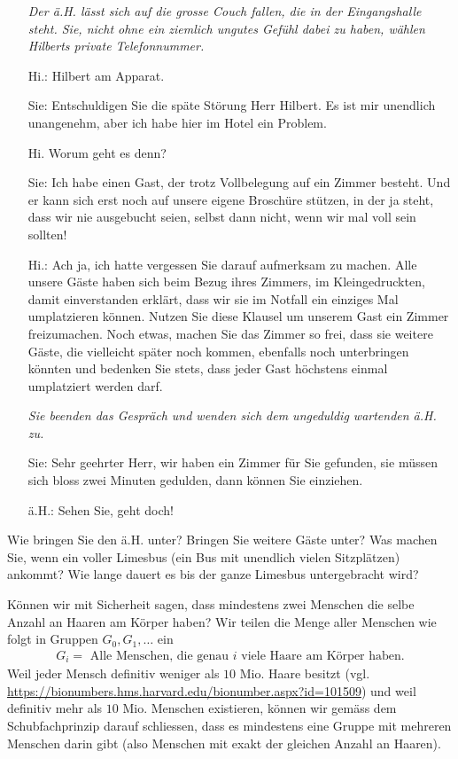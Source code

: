 \begin{example}
\begin{itemize}
\textit{Der ä.H. lässt sich auf die grosse Couch fallen, die in der Eingangshalle steht. Sie, nicht ohne ein ziemlich ungutes Gefühl dabei zu haben, wählen Hilberts private Telefonnummer.}
\item[Hi.:] Hilbert am Apparat.
\item[Sie:] Entschuldigen Sie die späte Störung Herr Hilbert. Es ist mir unendlich unangenehm, aber ich habe hier im Hotel ein Problem.
\item[Hi.] Worum geht es denn?
\item[Sie:] Ich habe einen Gast, der trotz Vollbelegung auf ein Zimmer besteht. Und er kann sich erst noch auf unsere eigene Broschüre stützen, in der ja steht, dass wir nie ausgebucht seien, selbst dann nicht, wenn wir mal voll sein sollten!
\item[Hi.:] Ach ja, ich hatte vergessen Sie darauf aufmerksam zu machen. Alle unsere Gäste haben sich beim Bezug ihres Zimmers, {\tiny im Kleingedruckten}, damit einverstanden erklärt, dass wir sie im Notfall ein einziges Mal umplatzieren können. Nutzen Sie diese Klausel um unserem Gast ein Zimmer freizumachen. Noch etwas, machen Sie das Zimmer so frei, dass sie weitere Gäste, die vielleicht später noch kommen, ebenfalls noch unterbringen könnten und bedenken Sie stets, dass jeder Gast höchstens einmal umplatziert werden darf.

\textit{Sie beenden das Gespräch und wenden sich dem ungeduldig wartenden ä.H. zu.}
\item[Sie:] Sehr geehrter Herr, wir haben ein Zimmer für Sie gefunden, sie müssen sich bloss zwei Minuten gedulden, dann können Sie einziehen.
\item[ä.H.:] Sehen Sie, geht doch!
\end{itemize}
Wie bringen Sie den ä.H. unter? Bringen Sie weitere Gäste unter? Was machen Sie, wenn ein voller Limesbus (ein Bus mit unendlich vielen Sitzplätzen) ankommt? Wie lange dauert es bis der ganze Limesbus untergebracht wird?
\end{example}

\begin{example}
    Können wir mit Sicherheit sagen, dass mindestens zwei Menschen die selbe Anzahl an Haaren am Körper haben?
    \tcblower
    Wir teilen die Menge aller Menschen wie folgt in Gruppen $G_0,G_1,\dots$ ein
    \begin{align*}
    G_i=\text{ Alle Menschen, die genau $i$ viele Haare am Körper haben.}
    \end{align*}
    Weil jeder Mensch definitiv weniger als $10$ Mio. Haare besitzt (vgl. \url{https://bionumbers.hms.harvard.edu/bionumber.aspx?id=101509}) und weil definitiv mehr als $10$ Mio. Menschen existieren, können wir gemäss dem Schubfachprinzip darauf schliessen, dass es mindestens eine Gruppe mit mehreren Menschen darin gibt (also Menschen mit exakt der gleichen Anzahl an Haaren).
\end{example}

